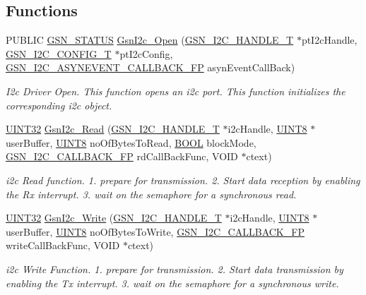 \subsection*{Functions}
\begin{DoxyCompactItemize}
\item 
PUBLIC \hyperlink{a00660_gada5951904ac6110b1fa95e51a9ddc217}{GSN\_\-STATUS} \hyperlink{a00649_ga51f57a33eaa6ad50b0c2bec9e0aab4db}{GsnI2c\_\-Open} (\hyperlink{a00100}{GSN\_\-I2C\_\-HANDLE\_\-T} $\ast$ptI2cHandle, \hyperlink{a00099}{GSN\_\-I2C\_\-CONFIG\_\-T} $\ast$ptI2cConfig, \hyperlink{a00649_gab1a00d4a51461218cbbafc33b29ddd89}{GSN\_\-I2C\_\-ASYNEVENT\_\-CALLBACK\_\-FP} asynEventCallBack)
\begin{DoxyCompactList}\small\item\em I2c Driver Open. This function opens an i2c port. This function initializes the corresponding i2c object. \end{DoxyCompactList}\item 
\hyperlink{a00660_gae1e6edbbc26d6fbc71a90190d0266018}{UINT32} \hyperlink{a00649_ga4af69729fab473b2eaf344209f86726d}{GsnI2c\_\-Read} (\hyperlink{a00100}{GSN\_\-I2C\_\-HANDLE\_\-T} $\ast$i2cHandle, \hyperlink{a00660_gab27e9918b538ce9d8ca692479b375b6a}{UINT8} $\ast$userBuffer, \hyperlink{a00660_gab27e9918b538ce9d8ca692479b375b6a}{UINT8} noOfBytesToRead, \hyperlink{a00660_ga1f04022c0a182c51c059438790ea138c}{BOOL} blockMode, \hyperlink{a00649_gac8a6faecb999f4f891344abbbfc08914}{GSN\_\-I2C\_\-CALLBACK\_\-FP} rdCallBackFunc, VOID $\ast$ctext)
\begin{DoxyCompactList}\small\item\em i2c Read function. 1. prepare for transmission. 2. Start data reception by enabling the Rx interrupt. 3. wait on the semaphore for a synchronous read. \end{DoxyCompactList}\item 
\hyperlink{a00660_gae1e6edbbc26d6fbc71a90190d0266018}{UINT32} \hyperlink{a00649_gae4d913972ddaffee2a1f2209af944983}{GsnI2c\_\-Write} (\hyperlink{a00100}{GSN\_\-I2C\_\-HANDLE\_\-T} $\ast$i2cHandle, \hyperlink{a00660_gab27e9918b538ce9d8ca692479b375b6a}{UINT8} $\ast$userBuffer, \hyperlink{a00660_gab27e9918b538ce9d8ca692479b375b6a}{UINT8} noOfBytesToWrite, \hyperlink{a00649_gac8a6faecb999f4f891344abbbfc08914}{GSN\_\-I2C\_\-CALLBACK\_\-FP} writeCallBackFunc, VOID $\ast$ctext)
\begin{DoxyCompactList}\small\item\em i2c Write Function. 1. prepare for transmission. 2. Start data transmission by enabling the Tx interrupt. 3. wait on the semaphore for a synchronous write. \end{DoxyCompactList}\item 

\end{DoxyCompactItemize}
